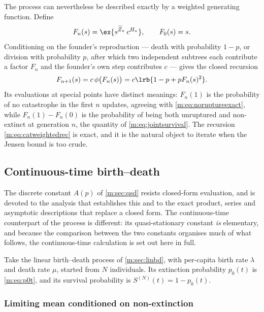 The process can nevertheless be described exactly by a weighted generating
function. Define
\begin{equation}
\label{m:eq:catweightedpgf}
F_n(s) = \ex{s^{\widetilde Z_n}\,c^{H_n}},
\qquad F_0(s) = s .
\end{equation}
Conditioning on the founder's reproduction --- death with probability $1-p$, or
division with probability $p$, after which two independent subtrees each contribute
a factor $F_n$ and the founder's own step contributes $c$ --- gives the closed
recursion
\begin{equation}
\label{m:eq:catweightedrec}
F_{n+1}(s) = c\,\phi\bigl(F_n(s)\bigr)
= c\lrb{1-p+pF_n(s)^2} .
\end{equation}
Its evaluations at special points have distinct meanings: $F_n(1)$ is the
probability of no catastrophe in the first $n$ updates, agreeing with
\cref{m:eq:noruptureexact}, while $F_n(1)-F_n(0)$ is the probability of being both
unruptured and non-extinct at generation $n$, the quantity of
\cref{m:eq:jointsurvival}. The recursion \cref{m:eq:catweightedrec} is exact, and
it is the natural object to iterate when the Jensen bound is too crude.

\subsection{Continuous-time birth--death}
\label{m:sec:cts}

The discrete constant $A(p)$ of \cref{m:sec:qsd} resists closed-form evaluation,
and \ChA{} is devoted to the analysis that establishes this and to the exact
product, series and asymptotic descriptions that replace a closed form. The
continuous-time counterpart of the process is different: its quasi-stationary
constant \emph{is} elementary, and because the comparison between the two
constants organises much of what follows, the continuous-time calculation is set
out here in full.

Take the linear birth--death process of \cref{m:sec:linbd}, with per-capita birth
rate $\lambda$ and death rate $\mu$, started from $N$ individuals. Its extinction
probability $p_0(t)$ is \cref{m:eq:p0t}, and its survival probability is
$S^{(N)}(t) = 1-p_0(t)$.

\subsubsection*{Limiting mean conditioned on non-extinction}

